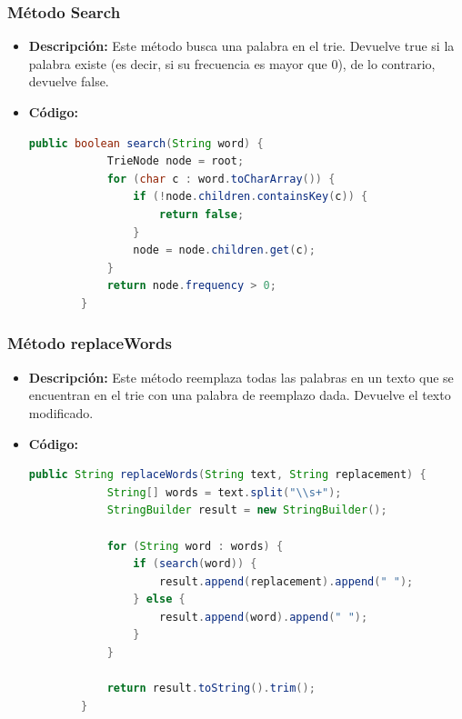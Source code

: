 \documentclass{article}
\begin{document}
  \subsubsection{Método Search}
  \begin{itemize}
    \item \textbf{Descripción: }Este método busca una palabra en el trie. Devuelve true si la palabra existe (es decir, si su frecuencia es mayor que 0), 
    de lo contrario, devuelve false.
    \item \textbf{Código: }
    \begin{lstlisting}[language=Java, caption={Método Search}]
        public boolean search(String word) {
            TrieNode node = root;
            for (char c : word.toCharArray()) {
                if (!node.children.containsKey(c)) {
                    return false;
                }
                node = node.children.get(c);
            }
            return node.frequency > 0;
        }
    \end{lstlisting}
  \end{itemize}
    
    
  
  \subsubsection{Método replaceWords}
  \begin{itemize}
    \item \textbf{Descripción: }Este método reemplaza todas las palabras en un texto que se encuentran en el trie con una palabra de reemplazo dada. 
    Devuelve el texto modificado.
    \item \textbf{Código: }
    \begin{lstlisting}[language=Java, caption={Método replaceWords}]
        public String replaceWords(String text, String replacement) {
            String[] words = text.split("\\s+");
            StringBuilder result = new StringBuilder();

            for (String word : words) {
                if (search(word)) {
                    result.append(replacement).append(" ");
                } else {
                    result.append(word).append(" ");
                }
            }

            return result.toString().trim();
        }
    \end{lstlisting}
  \end{itemize}
    
\end{document}
